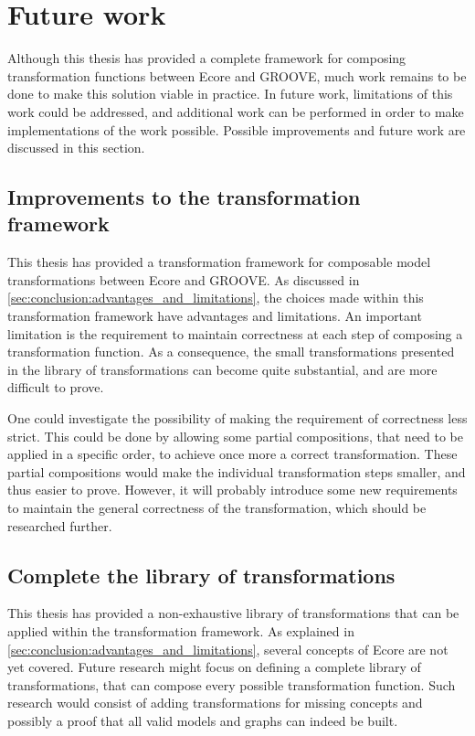 \section{Future work}
\label{sec:conclusion:future_work}

Although this thesis has provided a complete framework for composing transformation functions between Ecore and GROOVE, much work remains to be done to make this solution viable in practice. In future work, limitations of this work could be addressed, and additional work can be performed in order to make implementations of the work possible. Possible improvements and future work are discussed in this section.


\subsection{Improvements to the transformation framework}
\label{subsec:conclusion:future_work:improvements_to_the_transformation_framework}

This thesis has provided a transformation framework for composable model transformations between Ecore and GROOVE. As discussed in \cref{sec:conclusion:advantages_and_limitations}, the choices made within this transformation framework have advantages and limitations. An important limitation is the requirement to maintain correctness at each step of composing a transformation function. As a consequence, the small transformations presented in the library of transformations can become quite substantial, and are more difficult to prove.

One could investigate the possibility of making the requirement of correctness less strict. This could be done by allowing some partial compositions, that need to be applied in a specific order, to achieve once more a correct transformation. These partial compositions would make the individual transformation steps smaller, and thus easier to prove. However, it will probably introduce some new requirements to maintain the general correctness of the transformation, which should be researched further.


\subsection{Complete the library of transformations}
\label{subsec:conclusion:future_work:extend_the_library_of_transformations}

This thesis has provided a non-exhaustive library of transformations that can be applied within the transformation framework. As explained in \cref{sec:conclusion:advantages_and_limitations}, several concepts of Ecore are not yet covered. Future research might focus on defining a complete library of transformations, that can compose every possible transformation function. Such research would consist of adding transformations for missing concepts and possibly a proof that all valid models and graphs can indeed be built.

